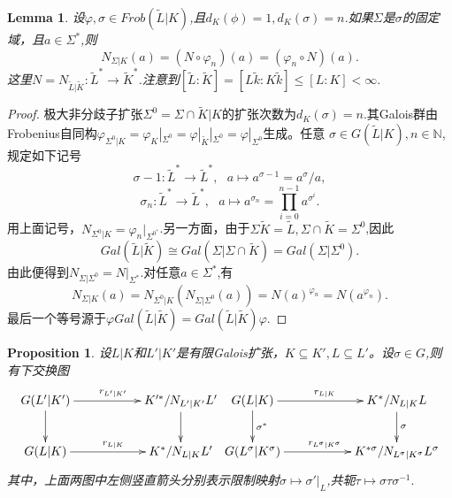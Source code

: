 \documentclass[UTF8]{article}
\newtheorem{prop}{Proposition}[section]
\newtheorem{lem}{Lemma}[section]
\begin{document}
\begin{lem}
	设$\varphi,\sigma\in Frob(\widetilde{L}|K)$,且$d_{K}(\phi)=1,d_{K}(\sigma)=n$.如果$\Sigma$是$\sigma$的固定域，且$a\in \Sigma^{*}$,则
	$$
	N_{\Sigma|K}(a)=(N\circ\varphi_{n})(a)=(\varphi_{n}\circ N)(a).
	$$
	这里$N=N_{\widetilde{L}|\widetilde{K}}:\widetilde{L}^{*}\rightarrow \widetilde{K}^{*}$.注意到$[\widetilde{L}:\widetilde{K}]=[L\widetilde{k}:K\widetilde{k}]\leq [L:K]< \infty.$
\end{lem}
\begin{proof}
	极大非分歧子扩张$\Sigma^{0}=\Sigma\cap \widetilde{K}|K$的扩张次数为$d_{K}(\sigma)=n.$其Galois群由Frobenius自同构$\varphi_{\Sigma^{0}|K}=\varphi_{K}|_{\Sigma^{0}}=\varphi|_{\widetilde{K}}|_{\Sigma^{0}}=\varphi|_{\Sigma^{0}}$生成。任意
	$\sigma\in G(\widetilde{L}|K),n\in \mathbb{N}$,规定如下记号
	$$
	\sigma-1:\widetilde{L}^{*}\rightarrow\widetilde{L}^{*},\ \ \ a\mapsto a^{\sigma-1}=a^\sigma/a,$$
	$$
	\sigma_{n}:\widetilde{L}^{*}\rightarrow\widetilde{L}^{*}, \ \ \ a\mapsto a^{\sigma_{n}}=\prod_{i=0}^{n-1}a^{\sigma^{i}}. 
	$$
	用上面记号，$N_{\Sigma^{0}|K}=\varphi_{n}|_{\Sigma^{0^{*}}}$.另一方面，由于$\Sigma\widetilde{K}=\widetilde{L},\Sigma\cap \widetilde{K}=\Sigma^{0}$,因此
	$$Gal(\widetilde{L}|\widetilde{K})\cong Gal(\Sigma|\Sigma\cap \widetilde{K})=Gal(\Sigma|\Sigma^{0}).$$
	由此便得到$N_{\Sigma|\Sigma^{0}}=N|_{\Sigma^{*}}$.对任意$a\in \Sigma^{*}$,有
	$$
	N_{\Sigma|K}(a)=N_{\Sigma^{0}|K}(N_{\Sigma|\Sigma^{0}}(a))=N(a)^{\varphi_{n}}=N(a^{\varphi_{n}}).
	$$
	最后一个等号源于$\varphi Gal(\widetilde{L}|\widetilde{K})=Gal(\widetilde{L}|\widetilde{K})\varphi$.
\end{proof}
\begin{prop}
	设$L|K$和$L'|K'$是有限Galois扩张，$K\subseteq K',L\subseteq L'$。设$\sigma\in G$,则有下交换图
$$
	\xymatrix{
G(L'|K')\ar[rr]^{r_{L'|K'}}\ar[d]& &K'^{*}/N_{L'|K'}L'\ar[d]\\
G(L|K)\ar[rr]^{r_{L|K}}& &K^{*}/N_{L|K}L'
}
\xymatrix{
G(L|K)\ar[rr]^{r_{L|K}}\ar[d]^{\sigma^{*}}& & K^{*}/N_{L|K}L\ar[d]^{\sigma}\\
G(L^{\sigma}|K^{\sigma})\ar[rr]^{r_{L^{\sigma}|K^{\sigma}}}& &K^{*\sigma}/N_{L^{\sigma}|K^{\sigma}}L^{\sigma}
}$$
其中，上面两图中左侧竖直箭头分别表示限制映射$\sigma\mapsto \sigma'|_{L}$,共轭$\tau\mapsto \sigma \tau\sigma^{-1}.$
\end{prop}
\end{document}
